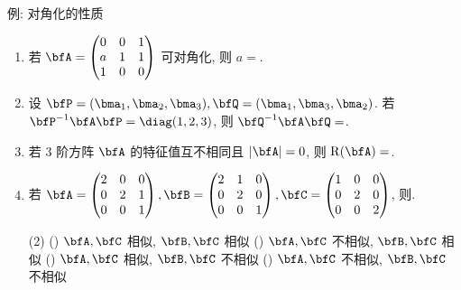 \begin{frame}{例: 对角化的性质}
	\onslide<+->
	\begin{exercise}
		\begin{enumerate}
			\item 若 $\bfA=\begin{pmatrix}
				0&0&1\\
				a&1&1\\
				1&0&0
			\end{pmatrix}$ 可对角化, 则 $a=$.
			\item 设 $\bfP=(\bma_1,\bma_2,\bma_3),\bfQ=(\bma_1,\bma_3,\bma_2)$.
			若 $\bfP^{-1}\bfA\bfP=\diag(1,2,3)$, 则 $\bfQ^{-1}\bfA\bfQ=$.
			\item 若 $3$ 阶方阵 $\bfA$ 的特征值互不相同且 $|\bfA|=0$, 则 $\rank(\bfA)=$.
			\item 若 $\bfA=\begin{pmatrix}
				2&0&0\\
				0&2&1\\
				0&0&1
			\end{pmatrix},\bfB=\begin{pmatrix}
				2&1&0\\
				0&2&0\\
				0&0&1
			\end{pmatrix},\bfC=\begin{pmatrix}
				1&0&0\\
				0&2&0\\
				0&0&2
			\end{pmatrix}$, 则.
			\begin{exchoice}(2)
				() $\bfA,\bfC$ 相似, $\bfB,\bfC$ 相似
				() $\bfA,\bfC$ 不相似, $\bfB,\bfC$ 相似
				() $\bfA,\bfC$ 相似, $\bfB,\bfC$ 不相似
				() $\bfA,\bfC$ 不相似, $\bfB,\bfC$ 不相似
			\end{exchoice}
		\end{enumerate}
	\end{exercise}
\end{frame}


